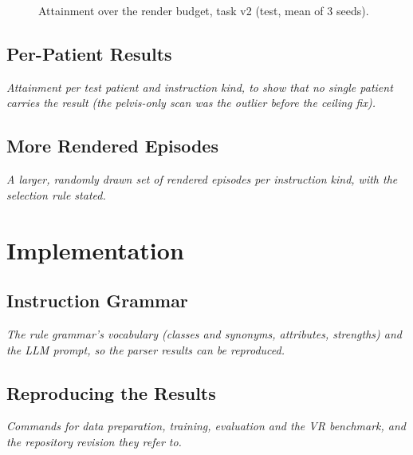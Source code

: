 \documentclass[12pt, a4paper]{book}
\newcommand{\plan}[1]{{\color{gray}\itshape #1\par}}
\begin{document}
\begin{figure}[ht]
  \centering
  \caption[Attainment over the render budget, task v2]{Attainment over the render budget, task v2 (test, mean of 3 seeds).}
  \label{fig:app-budget-v2}
\end{figure}

\section{Per-Patient Results}
\label{app:per-patient}
\plan{Attainment per test patient and instruction kind, to show that no single patient carries the result (the pelvis-only scan was the outlier before the ceiling fix).}

\section{More Rendered Episodes}
\label{app:episodes}
\plan{A larger, randomly drawn set of rendered episodes per instruction kind, with the selection rule stated.}

\chapter{Implementation}
\label{app:implementation}

\section{Instruction Grammar}
\label{app:grammar}
\plan{The rule grammar's vocabulary (classes and synonyms, attributes, strengths) and the LLM prompt, so the parser results can be reproduced.}

\section{Reproducing the Results}
\label{app:reproduce}
\plan{Commands for data preparation, training, evaluation and the VR benchmark, and the repository revision they refer to.}
\end{document}
